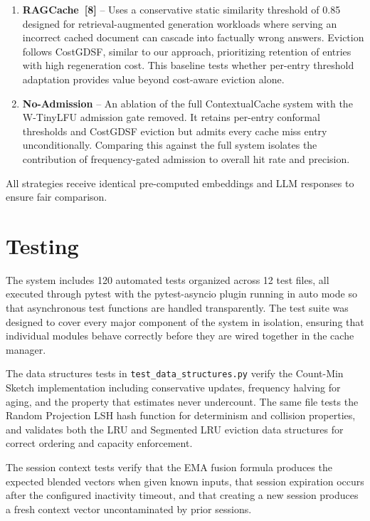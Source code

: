 \documentclass[12pt,a4paper]{report}
\begin{document}
\begin{enumerate}[label=(\roman*),leftmargin=2cm]
\item \textbf{RAGCache~[8]} -- Uses a conservative static similarity threshold of 0.85 designed for retrieval-augmented generation workloads where serving an incorrect cached document can cascade into factually wrong answers. Eviction follows CostGDSF, similar to our approach, prioritizing retention of entries with high regeneration cost. This baseline tests whether per-entry threshold adaptation provides value beyond cost-aware eviction alone.

\item \textbf{No-Admission} -- An ablation of the full ContextualCache system with the W-TinyLFU admission gate removed. It retains per-entry conformal thresholds and CostGDSF eviction but admits every cache miss entry unconditionally. Comparing this against the full system isolates the contribution of frequency-gated admission to overall hit rate and precision.
\end{enumerate}

All strategies receive identical pre-computed embeddings and LLM responses to ensure fair comparison.

\section{Testing}

The system includes 120 automated tests organized across 12 test files, all executed through pytest with the pytest-asyncio plugin running in auto mode so that asynchronous test functions are handled transparently. The test suite was designed to cover every major component of the system in isolation, ensuring that individual modules behave correctly before they are wired together in the cache manager.

The data structures tests in \texttt{test\_data\_structures.py} verify the Count-Min Sketch implementation including conservative updates, frequency halving for aging, and the property that estimates never undercount. The same file tests the Random Projection LSH hash function for determinism and collision properties, and validates both the LRU and Segmented LRU eviction data structures for correct ordering and capacity enforcement.

The session context tests verify that the EMA fusion formula produces the expected blended vectors when given known inputs, that session expiration occurs after the configured inactivity timeout, and that creating a new session produces a fresh context vector uncontaminated by prior sessions.
\end{document}
